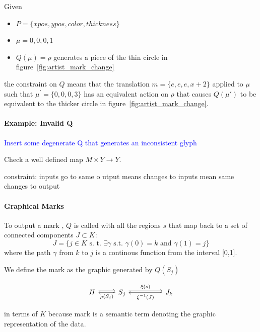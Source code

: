 \documentclass[../main.tex]{subfiles}
\begin{document}
Given  
\begin{itemize}
    \item $P = \{xpos, ypos, color, thickness\}$
    \item $\mu = {0,0,0, 1}$
    \item  $Q(\mu)=\rho$ generates a piece of the thin circle in figure~\ref{fig:artist_mark_change}
\end{itemize}

the constraint on $Q$ means that the translation $m=\{e, e, e, x+2\}$ applied to $\mu$ such that $\mu^\prime=\{0,0,0,3\}$ has an equivalent action on $\rho$ that causes $Q(\mu\prime)$ to be equivalent to the thicker circle in figure~\ref{fig:artist_mark_change}.


\paragraph{Example: Invalid Q}
\textcolor{blue}{Insert some degenerate Q that generates an inconsistent glyph}


Check a well defined map $M\times Y \rightarrow Y$.


constraint: inputs go to same o
utput means changes to inputs mean same changes to output

\paragraph{Graphical Marks}
To output a mark  \cite{bertinIIPropertiesGraphic2011,carpendaleVisualRepresentationSemiology}, $Q$ is called with all the regions $s$ that map back to a set of connected components $J \subset K$:
\begin{equation}
J = \{j \in K \text{ s. t. } \exists \gamma \text{ s.t. } \gamma(0)=k \text{ and }\gamma(1)=j\}
\end{equation}
where the path\cite{ConnectedSpace2020}  $\gamma$ from $k$ to $j$ is a continous function from the interval [0,1].

We define the mark as the graphic generated by $Q(S_j)$

\begin{equation}
    \begin{tikzcd}
        H \arrow[r, shift left] & S_j \arrow[rr, "\xi(s)", shift left] \arrow[l, "\rho(S_j)"] &  & J_{k} \arrow[ll, "\xi^{-1}(J)"]
        \end{tikzcd}
    \label{eq:mark}
\end{equation}

in terms of $K$ because mark is a semantic term denoting the graphic representation of the data.
\end{document}
